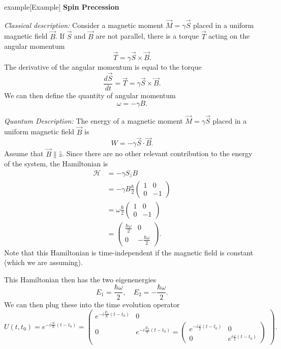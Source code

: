 \documentclass{article}
\begin{document}
\begin{callout}{example}[Example]
\label{example:s3-e2}
\textbf{Spin Precession}

\textit{Classical description:} Consider a magnetic moment $\vec{M}=\gamma \vec{S}$ placed in a uniform magnetic field $\vec{B}$. If $\vec{S}$ and $\vec{B}$ are not parallel, there is a torque $\vec{T}$ acting on the angular momentum
\[
    \vec{T}=\gamma \vec{S}\times \vec{B}.
\]
The derivative of the angular momentum is equal to the torque
\[
    \frac{d \vec{S}}{d t}=\vec{T}=\gamma \vec{S}\times\vec{B}.
\]
We can then define the quantity of angular momentum
\[
    \omega =-\gamma B.
\]

\textit{Quantum Description:} The energy of a magnetic moment $\vec{M}=\gamma \vec{S}$ placed in a uniform magnetic field $\vec{B}$ is
\[
    W=-\gamma \vec{S}\cdot\vec{B}.
\]
Assume that $\vec{B}\parallel\hat{z}$. Since there are no other relevant contribution to the energy of the system, the Hamiltonian is
\begin{align*}
    \mathcal{H} &= -\gamma S_zB \\
                &= -\gamma B \frac{\hbar}{2}\begin{pmatrix}
                    1 & 0 \\ 0 & -1
                \end{pmatrix} \\
                &= \omega \frac{\hbar}{2}\begin{pmatrix}
                    1 & 0 \\ 0 & -1
                \end{pmatrix} \\
                &=\begin{pmatrix}
                    \frac{\hbar\omega }{2} & 0 \\
                    0 & -\frac{\hbar\omega }{2}
                \end{pmatrix}.
\end{align*}
Note that this Hamiltonian is time-independent if the magnetic field is constant (which we are assuming).

This Hamiltonian then has the two eigenenergies
\[
    E_1=\frac{\hbar\omega }{2},\quad E_2=-\frac{\hbar\omega }{2}.
\]
We can then plug these into the time evolution operator
\[
    U(t,t_0)=e^{-i \frac{\mathcal{H}}{\hbar}(t-t_0)}=\begin{pmatrix}
        e^{-i \frac{E_1}{\hbar}(t-t_0)} & 0 \\
        0 & e^{-i \frac{E_2}{\hbar}(t-t_0)} =\begin{pmatrix}
            e^{-i \frac{\omega }{2}(t-t_0)} & 0 \\
            0 & e^{i \frac{\omega }{2}(t-t_0)}
        \end{pmatrix}
    \end{pmatrix}.
\]


\end{callout}
\end{document}
